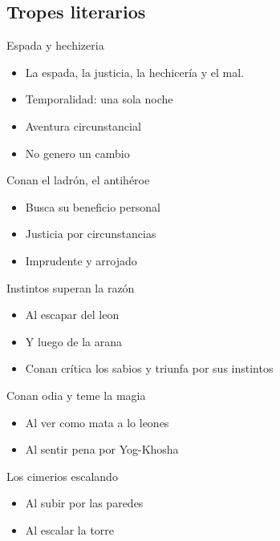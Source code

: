 \subsection{Tropes literarios}
\begin{frame}{Espada y hechizeria}
 \begin{itemize}
    \item La espada, la justicia, la hechicería y el mal.
    \item Temporalidad: una sola noche
    \item Aventura circunstancial
    \item No genero un cambio
 \end{itemize}
\end{frame}

\begin{frame}{Conan el ladrón, el antihéroe}
 \begin{itemize}
   \item Busca su beneficio personal
   \item Justicia por circunstancias
   \item Imprudente y arrojado
 \end{itemize}
\end{frame}

\begin{frame}{Instintos superan la razón}
 \begin{itemize}
    \item Al escapar del leon
    \item Y luego de la arana
    \item Conan crítica los sabios y triunfa por sus instintos
 \end{itemize}
\end{frame}

\begin{frame}{Conan odia y teme la magia}
 \begin{itemize}
    \item Al ver como mata a lo leones
    \item Al sentir pena por Yog-Khosha
 \end{itemize}
\end{frame}

\begin{frame}{Los cimerios escalando}
 \begin{itemize}
    \item Al subir por las paredes
    \item Al escalar la torre
 \end{itemize}
\end{frame}


